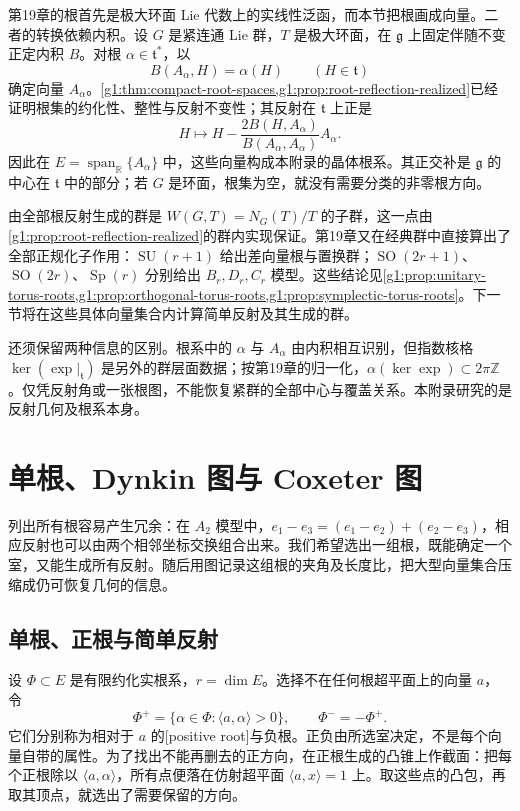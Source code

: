 第19章的根首先是极大环面 Lie 代数上的实线性泛函，而本节把根画成向量。二者的转换依赖内积。设 \(G\) 是紧连通 Lie 群，\(T\) 是极大环面，在 \(\mathfrak g\) 上固定伴随不变正定内积 \(B\)。对根 \(\alpha\in\mathfrak t^*\)，以
\[
	B(A_\alpha,H)=\alpha(H)\qquad(H\in\mathfrak t)
\]
确定向量 \(A_\alpha\)。\cref{g1:thm:compact-root-spaces,g1:prop:root-reflection-realized}已经证明根集的约化性、整性与反射不变性；其反射在 \(\mathfrak t\) 上正是
\[
	H\longmapsto H-\frac{2B(H,A_\alpha)}{B(A_\alpha,A_\alpha)}A_\alpha.
\]
因此在 \(E=\operatorname{span}_{\mathbb R}\{A_\alpha\}\) 中，这些向量构成本附录的晶体根系。其正交补是 \(\mathfrak g\) 的中心在 \(\mathfrak t\) 中的部分；若 \(G\) 是环面，根集为空，就没有需要分类的非零根方向。

\ProseParagraphBreak

由全部根反射生成的群是 \(W(G,T)=N_G(T)/T\) 的子群，这一点由\cref{g1:prop:root-reflection-realized}的群内实现保证。第19章又在经典群中直接算出了全部正规化子作用：\(\operatorname{SU}(r+1)\) 给出差向量根与置换群；\(\operatorname{SO}(2r+1)\)、\(\operatorname{SO}(2r)\)、\(\operatorname{Sp}(r)\) 分别给出 \(B_r,D_r,C_r\) 模型。这些结论见\cref{g1:prop:unitary-torus-roots,g1:prop:orthogonal-torus-roots,g1:prop:symplectic-torus-roots}。下一节将在这些具体向量集合内计算简单反射及其生成的群。

\ProseParagraphBreak

还须保留两种信息的区别。根系中的 \(\alpha\) 与 \(A_\alpha\) 由内积相互识别，但指数核格 \(\ker(\exp|_{\mathfrak t})\) 是另外的群层面数据；按第19章的归一化，\(\alpha(\ker\exp)\subset2\pi\mathbb Z\)。仅凭反射角或一张根图，不能恢复紧群的全部中心与覆盖关系。本附录研究的是反射几何及根系本身。

\section{单根、Dynkin 图与 Coxeter 图}
\label{g1:sec:E02}

列出所有根容易产生冗余：在 \(A_2\) 模型中，\(e_1-e_3=(e_1-e_2)+(e_2-e_3)\)，相应反射也可以由两个相邻坐标交换组合出来。我们希望选出一组根，既能确定一个室，又能生成所有反射。随后用图记录这组根的夹角及长度比，把大型向量集合压缩成仍可恢复几何的信息。

\subsection{单根、正根与简单反射}
\label{g1:subsec:E02:01}

设 \(\Phi\subset E\) 是有限约化实根系，\(r=\dim E\)。选择不在任何根超平面上的向量 \(a\)，令
\[
	\Phi^+=\{\alpha\in\Phi:\langle a,\alpha\rangle>0\},\qquad
	\Phi^-=-\Phi^+.
\]
它们分别称为相对于 \(a\) 的[positive root]与负根。正负由所选室决定，不是每个向量自带的属性。为了找出不能再删去的正方向，在正根生成的凸锥上作截面：把每个正根除以 \(\langle a,\alpha\rangle\)，所有点便落在仿射超平面 \(\langle a,x\rangle=1\) 上。取这些点的凸包，再取其顶点，就选出了需要保留的方向。


